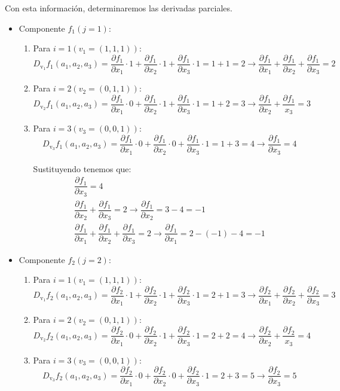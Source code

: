 \begin{enumerate}[label=\c olor{red}\textbf{\arabic*)}, leftmargin=*]
Con esta información, determinaremos las derivadas parciales.

\begin{itemize}
\item Componente $f_1(j=1):$
\begin{enumerate}[label=\arabic*)]
	\item Para $i=1(v_1=(1,1,1))$: \[ D_{\mathrm{v}_1}f_1(a_1,a_2,a_3)=\dfrac{\partial f_1}{\partial x_1}\cdot 1+\dfrac{\partial f_1}{\partial x_2}\cdot 1+\dfrac{\partial f_1}{\partial x_3}\cdot 1=1+1=2\longrightarrow\dfrac{\partial f_1}{\partial x_1}+\dfrac{\partial f_1}{\partial x_2}+\dfrac{\partial f_1}{\partial x_3}=2 \]
	\item Para $i=2(v_2=(0,1,1))$: \[ D_{\mathrm{v}_2}f_1(a_1,a_2,a_3)=\dfrac{\partial f_1}{\partial x_1}\cdot 0+\dfrac{\partial f_1}{\partial x_2}\cdot 1+\dfrac{\partial f_1}{\partial x_3}\cdot 1=1+2=3\longrightarrow\dfrac{\partial f_1}{\partial x_2}+\dfrac{\partial f_1}{x_3}=3 \]
	\item Para $i=3(v_3=(0,0,1))$: \[ D_{\mathrm{v}_3}f_1(a_1,a_2,a_3)=\dfrac{\partial f_1}{\partial x_1}\cdot 0+\dfrac{\partial f_1}{\partial x_2}\cdot 0+\dfrac{\partial f_1}{\partial x_3}\cdot 1=1+3=4\longrightarrow \dfrac{\partial f_1}{\partial x_3}=4 \]
	
	Sustituyendo tenemos que: \[ \begin{array}{l}
	\dfrac{\partial f_1}{\partial x_3}=4\\
	\dfrac{\partial f_1}{\partial x_2}+\dfrac{\partial f_1}{\partial x_3}=2\longrightarrow \dfrac{\partial f_1}{\partial x_2}=3-4=-1\\
	\dfrac{\partial f_1}{\partial x_1}+\dfrac{\partial f_1}{\partial x_2}+\dfrac{\partial f_1}{\partial x_3}=2\longrightarrow \dfrac{\partial f_1}{\partial x_1}=2-(-1)-4=-1
	\end{array} \]
\end{enumerate}
\item Componente $f_2(j=2)$: 
\begin{enumerate}[label=\arabic*)]
	\item Para $i=1(v_1=(1,1,1))$: \[ D_{\mathrm{v}_1}f_2(a_1,a_2,a_3)=\dfrac{\partial f_2}{\partial x_1}\cdot 1+\dfrac{\partial f_2}{\partial x_2}\cdot 1+\dfrac{\partial f_2}{\partial x_3}\cdot 1=2+1=3\longrightarrow\dfrac{\partial f_2}{\partial x_1}+\dfrac{\partial f_2}{\partial x_2}+\dfrac{\partial f_2}{\partial x_3}=3 \]
	\item Para $i=2(v_2=(0,1,1))$: \[ D_{\mathrm{v}_2}f_2(a_1,a_2,a_3)=\dfrac{\partial f_2}{\partial x_1}\cdot 0+\dfrac{\partial f_2}{\partial x_2}\cdot 1+\dfrac{\partial f_2}{\partial x_3}\cdot 1=2+2=4\longrightarrow\dfrac{\partial f_2}{\partial x_2}+\dfrac{\partial f_2}{x_3}=4 \]
	\item Para $i=3(v_3=(0,0,1))$: \[ D_{\mathrm{v}_3}f_2(a_1,a_2,a_3)=\dfrac{\partial f_2}{\partial x_1}\cdot 0+\dfrac{\partial f_2}{\partial x_2}\cdot 0+\dfrac{\partial f_2}{\partial x_3}\cdot 1=2+3=5\longrightarrow \dfrac{\partial f_2}{\partial x_3}=5 \]
	

\end{enumerate}
\end{itemize}
\end{enumerate}

